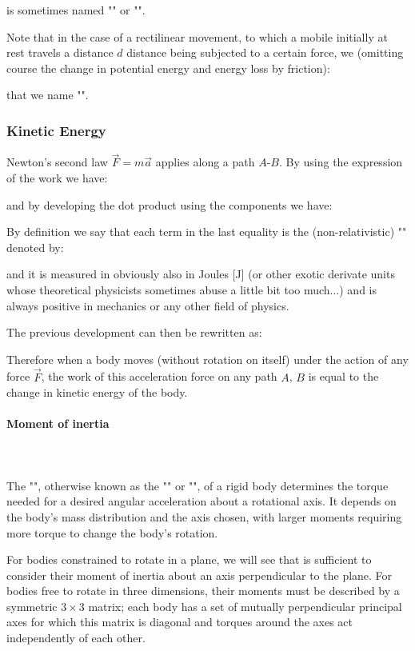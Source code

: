 	is sometimes named "" or "".

	Note that in the case of a rectilinear movement, to which a mobile initially at rest travels a distance $d$ distance being subjected to a certain force, we (omitting course the change in potential energy and energy loss by friction):
	
	that we name "".
	
	\subsubsection{Kinetic Energy}
	Newton's second law $\vec{F}=m\vec{a}$ applies along a path $A$-$B$. By using the expression of the work we have:
	
	and by developing the dot product using the components we have:
	
	By definition we say that each term in the last equality is the (non-relativistic) "" denoted by:
	
	and it is measured in obviously also in Joules [J] (or other exotic derivate units whose theoretical physicists sometimes abuse a little bit too much...) and is always positive in mechanics or any other field of physics.

	The previous development can then be rewritten as:
	
	Therefore when a body moves (without rotation on itself) under the action of any force $\vec{F}$, the work of this acceleration force on any path $A$, $B$ is equal to the change in kinetic energy of the body.
	
	\paragraph{Moment of inertia}\mbox{}\\\\
	The "", otherwise known as the "" or "", of a rigid body determines the torque needed for a desired angular acceleration about a rotational axis. It depends on the body's mass distribution and the axis chosen, with larger moments requiring more torque to change the body's rotation. 

	For bodies constrained to rotate in a plane, we will see that is sufficient to consider their moment of inertia about an axis perpendicular to the plane. For bodies free to rotate in three dimensions, their moments must be described by a symmetric $3\times 3$ matrix; each body has a set of mutually perpendicular principal axes for which this matrix is diagonal and torques around the axes act independently of each other.
	
